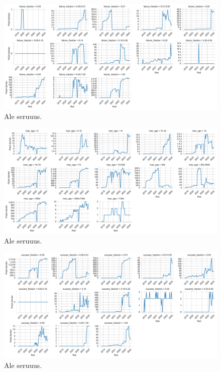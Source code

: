 \pagebreak


\begin{figure}[!htb]
\begin{center}
 \includegraphics[scale=0.447]{obrazky-figures/httparchive_nel_config_ff_dist.pdf}
 \caption{\centering Ale seruuus.}
 \label{fig:httparchive-nel-config-ff-dist}
\end{center}
\end{figure}

\pagebreak


\begin{figure}[!htb]
\begin{center}
 \includegraphics[scale=0.447]{obrazky-figures/httparchive_nel_config_ma_dist.pdf}
 \caption{\centering Ale seruuus.}
 \label{fig:httparchive-nel-config-ma-dist}
\end{center}
\end{figure}

\pagebreak


\begin{figure}[!htb]
\begin{center}
 \includegraphics[scale=0.447]{obrazky-figures/httparchive_nel_config_sf_dist.pdf}
 \caption{\centering Ale seruuus.}
 \label{fig:httparchive-nel-config-sf-dist}
\end{center}
\end{figure}

